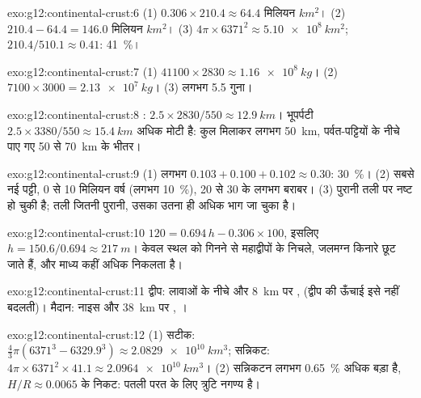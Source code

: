\begin{solution}{exo:g12:continental-crust:6}
(1) $0.306 \times 210.4 \approx \num{64.4}\text{ मिलियन }\unit{km^2}$।
(2) $210.4 - 64.4 = \num{146.0}\text{ मिलियन }\unit{km^2}$।
(3) $4\pi \times 6371^2 \approx \qty{5.10e8}{km^2}$; $210.4/510.1 \approx
0.41$: \qty{41}{\percent}।
\end{solution}

\begin{solution}{exo:g12:continental-crust:7}
(1) $41100 \times 2830 \approx \qty{1.16e8}{kg}$। (2) $7100 \times 3000 =
\qty{2.13e7}{kg}$। (3) लगभग 5.5 गुना।
\end{solution}

\begin{solution}{exo:g12:continental-crust:8}
: $2.5 \times 2830/550 \approx \qty{12.9}{km}$। भूपर्पटी
$2.5 \times 3380/550 \approx \qty{15.4}{km}$ अधिक मोटी है: कुल मिलाकर लगभग \qty{50}{km},
पर्वत-पट्टियों के नीचे पाए गए 50 से \qty{70}{km} के भीतर।
\end{solution}

\begin{solution}{exo:g12:continental-crust:9}
(1) लगभग $0.103 + 0.100 + 0.102 \approx 0.30$: \qty{30}{\percent}।
(2) सबसे नई पट्टी, 0 से 10 मिलियन वर्ष (लगभग \qty{10}{\percent}),
20 से 30 के लगभग बराबर। (3) पुरानी तली  पर नष्ट हो चुकी है;
तली जितनी पुरानी, उसका उतना ही अधिक भाग जा चुका है।
\end{solution}

\begin{solution}{exo:g12:continental-crust:10}
$120 = 0.694\,h - 0.306 \times 100$, इसलिए $h = 150.6/0.694 \approx
\qty{217}{m}$। केवल स्थल को गिनने से महाद्वीपों के निचले, जलमग्न किनारे
छूट जाते हैं, और माध्य कहीं अधिक निकलता है।
\end{solution}

\begin{solution}{exo:g12:continental-crust:11}
द्वीप: लावाओं के नीचे  और \qty{8}{km} पर , 
(द्वीप की ऊँचाई इसे नहीं बदलती)। मैदान: नाइस और
\qty{38}{km} पर , ।
\end{solution}

\begin{solution}{exo:g12:continental-crust:12}
(1) सटीक: $\tfrac{4}{3}\pi(6371^3 - 6329.9^3) \approx
\qty{2.0829e10}{km^3}$; सन्निकट: $4\pi \times 6371^2 \times 41.1
\approx \qty{2.0964e10}{km^3}$। (2) सन्निकटन लगभग
\qty{0.65}{\percent} अधिक बड़ा है, $H/R \approx 0.0065$ के निकट: पतली परत के लिए
त्रुटि नगण्य है।
\end{solution}

